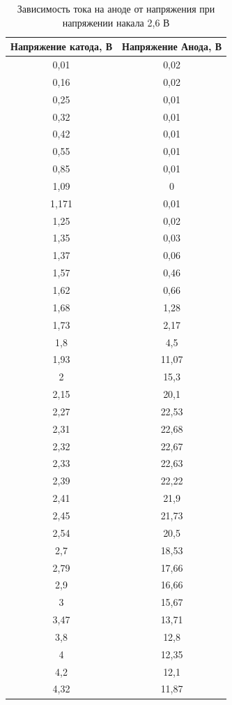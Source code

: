 \documentclass[a4paper,14pt]{extarticle}
\begin{document}
	\begin{table}[h!]
	\centering
	\caption{Зависимость тока на аноде от напряжения при напряжении накала 2,6 В}
	\begin{tabular}{|c|c|}
		\hline
		Напряжение катода, В&Напряжение Анода, В  \\ \hline
		0,01	&	0,02	\\ \hline
0,16	&	0,02	\\ \hline
0,25	&	0,01	\\ \hline
0,32	&	0,01	\\ \hline
0,42	&	0,01	\\ \hline
0,55	&	0,01	\\ \hline
0,85	&	0,01	\\ \hline
1,09	&	0	\\ \hline
1,171	&	0,01	\\ \hline
1,25	&	0,02	\\ \hline
1,35	&	0,03	\\ \hline
1,37	&	0,06	\\ \hline
1,57	&	0,46	\\ \hline
1,62	&	0,66	\\ \hline
1,68	&	1,28	\\ \hline
1,73	&	2,17	\\ \hline
1,8	&	4,5	\\ \hline
1,93	&	11,07	\\ \hline
2	&	15,3	\\ \hline
2,15	&	20,1	\\ \hline
2,27	&	22,53	\\ \hline
2,31	&	22,68	\\ \hline
2,32	&	22,67	\\ \hline
2,33	&	22,63	\\ \hline
2,39	&	22,22	\\ \hline
2,41	&	21,9	\\ \hline
2,45	&	21,73	\\ \hline
2,54	&	20,5	\\ \hline
2,7	&	18,53	\\ \hline
2,79	&	17,66	\\ \hline
2,9	&	16,66	\\ \hline
3	&	15,67	\\ \hline
3,47	&	13,71	\\ \hline
3,8	&	12,8	\\ \hline
4	&	12,35	\\ \hline
4,2	&	12,1	\\ \hline
4,32	&	11,87	\\ \hline

\end{tabular}
\end{table}
\end{document}
